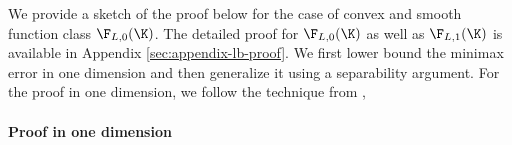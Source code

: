 \label{sec:lb-proof}
We provide a sketch of the proof below for the case of convex and smooth function class $\F_{L,0}(\K)$. The detailed proof for $\F_{L,0}(\K)$ as well as $\F_{L,1}(\K)$ is available in Appendix \ref{sec:appendix-lb-proof}.
We first lower bound  the minimax error in one dimension and then generalize it using a separability argument. For the proof in one dimension, we follow the technique from \cite{shamir2012complexity,duchi2015optimal},

\paragraph{Proof in one dimension}


